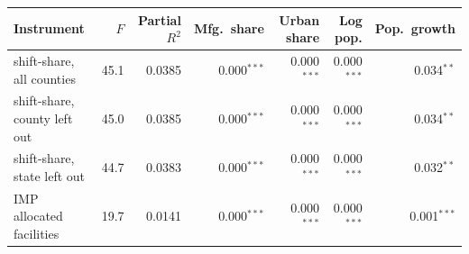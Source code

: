 \begin{tabular}{lrrrrrr}
\toprule
Instrument & $F$ & Partial $R^2$ & Mfg.\ share & Urban share & Log pop. & Pop.\ growth \\
\midrule
shift-share, all counties & 45.1 & 0.0385 & 0.000$^{***}$ & 0.000$^{***}$ & 0.000$^{***}$ & 0.034$^{**}$ \\
shift-share, county left out & 45.0 & 0.0385 & 0.000$^{***}$ & 0.000$^{***}$ & 0.000$^{***}$ & 0.034$^{**}$ \\
shift-share, state left out & 44.7 & 0.0383 & 0.000$^{***}$ & 0.000$^{***}$ & 0.000$^{***}$ & 0.032$^{**}$ \\
IMP allocated facilities & 19.7 & 0.0141 & 0.000$^{***}$ & 0.000$^{***}$ & 0.000$^{***}$ & 0.001$^{***}$ \\
\bottomrule
\end{tabular}